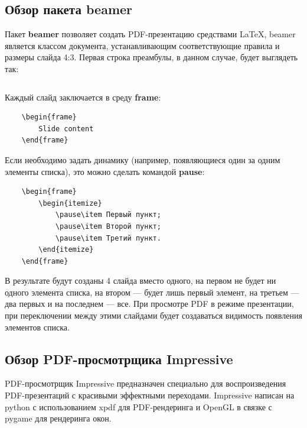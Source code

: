 \subsection{Обзор пакета beamer}

Пакет \textbf{beamer} позволяет создать PDF-презентацию средствами \LaTeX, beamer является классом документа, устанавливающим соответствующие правила и размеры слайда 4:3. Первая строка преамбулы, в данном случае, будет выглядеть так:

\inputminted[breaklines,firstline=3,lastline=3,fontsize=\small]{latex}{/home/ewancoder/Dropbox/LaRep/beamer.tex}

Каждый слайд заключается в среду \textbf{frame}:

\begin{verbatim}
    \begin{frame}
        Slide content
    \end{frame}
\end{verbatim}

Если необходимо задать динамику (например, появляющиеся один за одним элементы списка), это можно сделать командой \textbf{pause}:

\begin{verbatim}
    \begin{frame}
        \begin{itemize}
            \pause\item Первый пункт;
            \pause\item Второй пункт;
            \pause\item Третий пункт.
        \end{itemize}
    \end{frame}
\end{verbatim}

В результате будут созданы 4 слайда вместо одного, на первом не будет ни одного элемента списка, на втором --- будет лишь первый элемент, на третьем --- два первых и на последнем --- все. При просмотре PDF в режиме презентации, при переключении между этими слайдами будет создаваться видимость появления элементов списка.

\subsection{Обзор PDF-просмотрщика Impressive}

PDF-просмотрщик Impressive предназначен специально для воспроизведения PDF-презентаций с красивыми эффектными переходами. Impressive написан на python с использованием xpdf для PDF-рендеринга и OpenGL в связке с pygame для рендеринга окон. 

